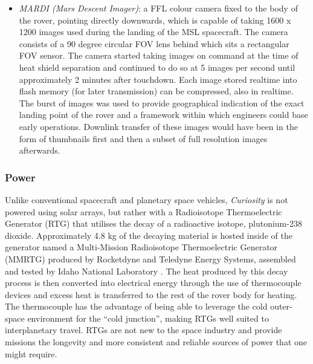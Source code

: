\begin{itemize}
\begin{itemize}
            \item \textit{MARDI (Mars Descent Imager)}: a FFL colour camera fixed to the body of the rover, pointing directly downwards, which is capable of taking 1600 x 1200 images used during the landing of the MSL spacecraft. The camera consists of a 90 degree circular FOV lens behind which sits a rectangular FOV sensor. The camera started taking images on command at the time of heat shield separation and continued to do so at 5 images per second until approximately 2 minutes after touchdown. Each image stored realtime into flash memory (for later transmission) can be compressed, also in realtime. The burst of images was used to provide geographical indication of the exact landing point of the rover and a framework within which engineers could base early operations. Downlink transfer of these images would have been in the form of thumbnails first and then a subset of full resolution images afterwards.
          \end{itemize}
        \end{itemize}
      
      \subsubsection{Power}
        Unlike conventional spacecraft and planetary space vehicles, \textit{Curiosity} is not powered using solar arrays, but rather with a Radioisotope Thermoelectric Generator (RTG) that utilises the decay of a radioactive isotope, plutonium-238 dioxide. Approximately 4.8 kg of the decaying material is hosted inside of the generator named a Multi-Mission Radioisotope Thermoelectric Generator (MMRTG) produced by Rocketdyne and Teledyne Energy Systems, assembled and tested by Idaho National Laboratory \cite{inlgovfuelingcuriosity}. The heat produced by this decay process is then converted into electrical energy through the use of thermocouple devices and excess heat is transferred to the rest of the rover body for heating. The thermocouple has the advantage of being able to leverage the cold outer-space environment for the ``cold junction'', making RTGs well suited to interplanetary travel. RTGs are not new to the space industry and provide missions the longevity and more consistent and reliable sources of power that one might require.
        
